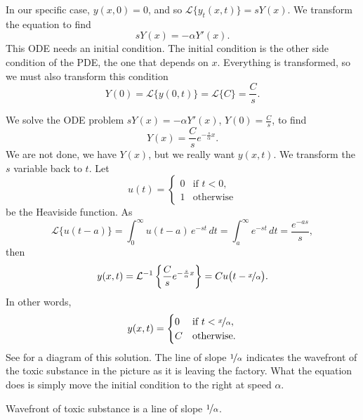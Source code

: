 \begin{example}
In our specific case,
$y(x,0)=0$, and so
${\mathcal L} \bigl\{ y_t(x,t) \bigr\} = sY(x)$.  We transform the equation
to find
\begin{equation*}
sY(x) = -\alpha Y'(x) .
\end{equation*}
This ODE needs an initial condition.  The initial condition is the
other side condition of the PDE\@, the one that depends on $x$.  Everything
is transformed, so we must also transform this condition
\begin{equation*}
Y(0) = 
{\mathcal L} \bigl\{ y(0,t) \bigr\} 
=
{\mathcal L} \bigl\{ C \bigr\} 
=
\frac{C}{s} .
\end{equation*}

We solve the ODE problem $sY(x) = -\alpha Y'(x)$, $Y(0) = \frac{C}{s}$, to find
\begin{equation*}
Y(x) = \frac{C}{s} e^{-\frac{s}{\alpha} x} .
\end{equation*}
We are not done, we have $Y(x)$, but we really want $y(x,t)$.  We 
transform the $s$ variable back to $t$.
Let 
\begin{equation*}
u(t) = \begin{cases} 0 & \text{if $t < 0$}, \\ 1 & \text{otherwise}
\end{cases}
\end{equation*}
be the Heaviside function.
As
\begin{equation*}
{\mathcal L} \bigl\{ u(t-a) \bigr\} =
\int_0^\infty u(t-a) \, e^{-st} \,dt
=
\int_a^\infty e^{-st} \,dt
=
\frac{e^{-as}}{s} ,
\end{equation*}
then
\begin{equation*}
y(x,t) = {\mathcal L}^{-1} \left\{
\frac{C}{s} e^{-\frac{s}{\alpha} x}
\right\}
=
C u\bigl(t-\nicefrac{x}{\alpha}\bigr) .
\end{equation*}
In other words,
\begin{equation*}
y(x,t) =
\begin{cases}
0 & \text{if $t < \nicefrac{x}{\alpha}$}, \\
C & \text{otherwise.}
\end{cases}
\end{equation*}
See  for a diagram of this
solution.  The line of slope $\nicefrac{1}{\alpha}$ indicates
the wavefront of the toxic substance in the picture as it is leaving the
factory.
What the equation does is simply move the initial condition to the right at
speed $\alpha$.

\begin{myfig}
\capstart
{}
\caption{Wavefront of toxic substance is a line of slope
$\nicefrac{1}{\alpha}$.\label{lt:half-infinite-goo-river-wavefront}}
\end{myfig}



\end{example}
